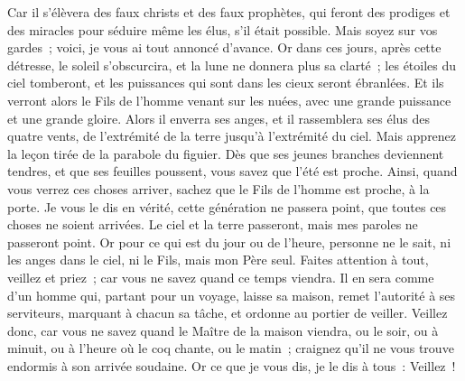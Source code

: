 \begin{multicols}{2}
Car il s'élèvera des faux christs et des faux prophètes, qui feront des prodiges et des miracles pour séduire même les élus, s'il était possible.
Mais soyez sur vos gardes~; voici, je vous ai tout annoncé d'avance.
Or dans ces jours, après cette détresse, le soleil s'obscurcira, et la lune ne donnera plus sa clarté~;
les étoiles du ciel tomberont, et les puissances qui sont dans les cieux seront ébranlées.
Et ils verront alors le Fils de l'homme venant sur les nuées, avec une grande puissance et une grande gloire.
Alors il enverra ses anges, et il rassemblera ses élus des quatre vents, de l'extrémité de la terre jusqu'à l'extrémité du ciel.
Mais apprenez la leçon tirée de la parabole du figuier. Dès que ses jeunes branches deviennent tendres, et que ses feuilles poussent, vous savez que l'été est proche.
Ainsi, quand vous verrez ces choses arriver, sachez que le Fils de l'homme est proche, à la porte.
Je vous le dis en vérité, cette génération ne passera point, que toutes ces choses ne soient arrivées.
Le ciel et la terre passeront, mais mes paroles ne passeront point.
Or pour ce qui est du jour ou de l'heure, personne ne le sait, ni les anges dans le ciel, ni le Fils, mais mon Père seul.
Faites attention à tout, veillez et priez~; car vous ne savez quand ce temps viendra.
Il en sera comme d'un homme qui, partant pour un voyage, laisse sa maison, remet l'autorité à ses serviteurs, marquant à chacun sa tâche, et ordonne au portier de veiller.
Veillez donc, car vous ne savez quand le Maître de la maison viendra, ou le soir, ou à minuit, ou à l'heure où le coq chante, ou le matin~;
craignez qu'il ne vous trouve endormis à son arrivée soudaine.
Or ce que je vous dis, je le dis à tous~: Veillez~!

\end{multicols}
